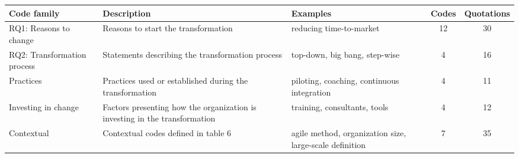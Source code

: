 \centering

 \label{codefamilytable}
\begin{center}
    \begin{tabular}{l p{10em} p{11em} c c }
        \bfseries{Code family} & \bfseries{Description} & \bfseries{Examples} & \bfseries{Codes} & \bfseries{Quotations}\\
        \hline
        RQ1: Reasons to change & Reasons to start the transformation & reducing time-to-market & 12& 30 \\
        RQ2: Transformation process & Statements describing the transformation process & top-down, big bang, step-wise & 4 & 16 \\
        Practices & Practices used or established during the transformation & piloting, coaching, continuous integration & 4 & 11 \\
        Investing in change & Factors presenting how the organization is investing in the transformation & training, consultants, tools & 4 & 12 \\
        Contextual & Contextual codes defined in table 6 & agile method, organization size, large-scale definition & 7 & 35 \\
        \hline
    \end{tabular}
\end{center}
\justify
